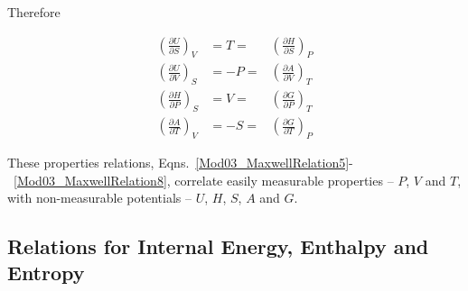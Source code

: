 \documentclass[12pts,a4paper,amsmath,amssymb,floatfix]{article}%
\newcommand{\frc}{\displaystyle\frac}
\begin{document}
Therefore
   \begin{shaded}
      \begin{subequations}
         \begin{eqnarray}
             \left(\frc{\partial U}{\partial S}\right)_{V} & =  T = & \left(\frc{\partial H}{\partial S}\right)_{P}\label{Mod03_MaxwellRelation5} \\
             \left(\frc{\partial U}{\partial V}\right)_{S} & = -P = & \left(\frc{\partial A}{\partial V}\right)_{T}\label{Mod03_MaxwellRelation6} \\
             \left(\frc{\partial H}{\partial P}\right)_{S} & =  V = & \left(\frc{\partial G}{\partial P}\right)_{T}\label{Mod03_MaxwellRelation7} \\
             \left(\frc{\partial A}{\partial T}\right)_{V} & = -S = & \left(\frc{\partial G}{\partial T}\right)_{P}\label{Mod03_MaxwellRelation8}
         \end{eqnarray}
      \end{subequations}
   \end{shaded}
These properties relations, Eqns.~\ref{Mod03_MaxwellRelation5}-~\ref{Mod03_MaxwellRelation8}, correlate easily measurable properties -- $P$, $V$ and $T$, with non-measurable potentials -- $U$, $H$, $S$, $A$ and $G$.


\subsection{Relations for Internal Energy, Enthalpy and Entropy}\label{Section:03:U_H_S_Relations}
\end{document}
